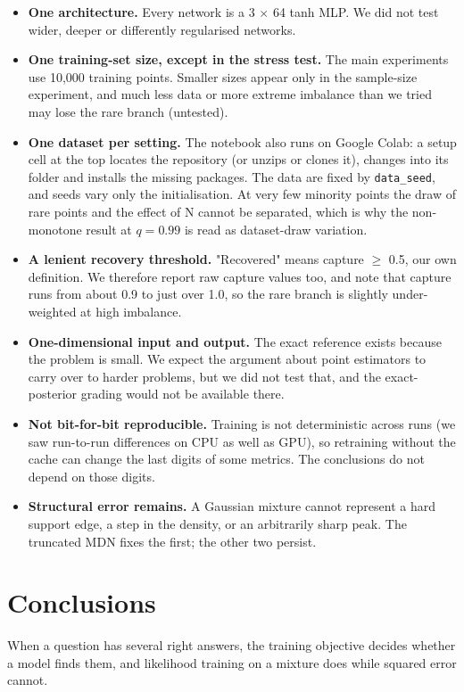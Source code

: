 \documentclass[11pt,a4paper]{article}
\begin{document}
\begin{itemize}
\item \textbf{One architecture.} Every network is a 3 $\times$ 64 tanh MLP. We did not test wider, deeper or differently regularised networks.
\item \textbf{One training-set size, except in the stress test.} The main experiments use 10,000 training points. Smaller sizes appear only in the sample-size experiment, and much less data or more extreme imbalance than we tried may lose the rare branch (untested).
\item \textbf{One dataset per setting.} The notebook also runs on Google Colab: a setup cell at the top locates the repository (or unzips or clones it), changes into its folder and installs the missing packages. The data are fixed by \texttt{data\_\allowbreak{}seed}, and seeds vary only the initialisation. At very few minority points the draw of rare points and the effect of N cannot be separated, which is why the non-monotone result at $q = 0.99$ is read as dataset-draw variation.
\item \textbf{A lenient recovery threshold.} "Recovered" means capture $\ge$ 0.5, our own definition. We therefore report raw capture values too, and note that capture runs from about 0.9 to just over 1.0, so the rare branch is slightly under-weighted at high imbalance.
\item \textbf{One-dimensional input and output.} The exact reference exists because the problem is small. We expect the argument about point estimators to carry over to harder problems, but we did not test that, and the exact-posterior grading would not be available there.
\item \textbf{Not bit-for-bit reproducible.} Training is not deterministic across runs (we saw run-to-run differences on CPU as well as GPU), so retraining without the cache can change the last digits of some metrics. The conclusions do not depend on those digits.
\item \textbf{Structural error remains.} A Gaussian mixture cannot represent a hard support edge, a step in the density, or an arbitrarily sharp peak. The truncated MDN fixes the first; the other two persist.
\end{itemize}

\section{Conclusions}
When a question has several right answers, the training objective decides whether a model finds them, and likelihood training on a mixture does while squared error cannot.
\end{document}
